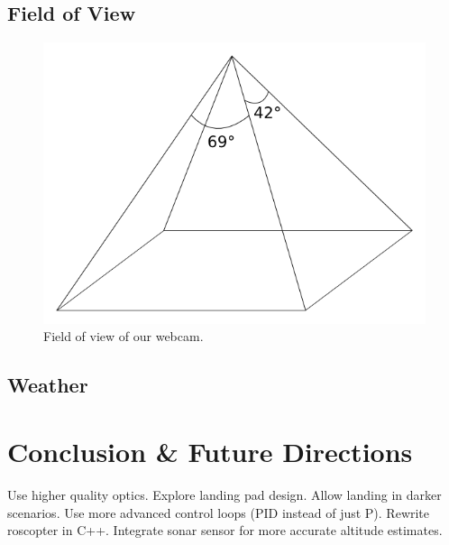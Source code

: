 \documentclass[10pt]{scrartcl} %
\begin{document}
\subsection{Field of View}



\begin{figure}[h]
    \centering
    \includegraphics{images/fov.png}
    \caption{Field of view of our webcam.}
    \label{fig:fov}
\end{figure}

\subsection{Weather}


\section{Conclusion \& Future Directions}

Use higher quality optics.
Explore landing pad design.
Allow landing in darker scenarios.
Use more advanced control loops (PID instead of just P).
Rewrite roscopter in C++.
Integrate sonar sensor for more accurate altitude estimates.
\end{document}

